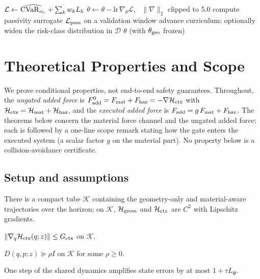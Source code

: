\begin{algorithm}[htbp]
\begin{algorithmic}[1]
    \State $\mathcal L\leftarrow\widehat{\mathrm{CVaR}_{\alpha_c}}+\sum_k w_kL_k$
    \State $\theta\leftarrow\theta-\mathrm{lr}\,\nabla_\theta\mathcal L$, \ $\|\nabla\|_2$ clipped to $5.0$
  \EndFor
  \State compute passivity surrogate $\mathcal L_{\rm pass}$ on a validation window
    \State advance curriculum; optionally widen the risk-class distribution in $\mathcal D$
  \EndIf
\EndFor
\State \Return $\theta$ (with $\theta_{\rm geo}$ frozen)
\end{algorithmic}
\end{algorithm}

\section{Theoretical Properties and Scope}
\label{app:theory}
We prove conditional properties, not end-to-end safety guarantees. Throughout, the \emph{ungated added force} is $F_{\rm add}^0=F_{\rm mat}+F_{\rm haz} =-\nabla\mathcal{H}_{\rm ctx}$ with $\mathcal{H}_{\rm ctx}=\mathcal{H}_{\rm mat}+\mathcal{H}_{\rm haz}$, and the \emph{executed added force} is $F_{\rm add}=g\,F_{\rm mat}+F_{\rm haz}$. The theorems below concern the material force channel and the ungated added
force; each is followed by a one-line scope remark stating how the gate enters
the executed system (a scalar factor $g$ on the material part). No property
below is a collision-avoidance certificate.

\subsection{Setup and assumptions}
\label{app:theory_setup}
\begin{assumption}\label{ass:regularity}
There is a compact tube $\mathcal K$ containing the geometry-only and
material-aware trajectories over the horizon; on $\mathcal K$, $\mathcal{H}_{\rm geom}$
and $\mathcal{H}_{\rm ctx}$ are $C^2$ with Lipschitz gradients.
\end{assumption}
\begin{assumption}\label{ass:bounded_ctx}
$\|\nabla_q\mathcal{H}_{\rm ctx}(q;z)\|\le G_{\rm ctx}$ on $\mathcal K$.
\end{assumption}
\begin{assumption}\label{ass:diss}
$D(q,p;z)\succeq\rho I$ on $\mathcal K$ for some $\rho\ge0$.
\end{assumption}
\begin{assumption}\label{ass:lipschitz_rollout}
One step of the shared dynamics amplifies state errors by at most $1+\tau L_\Phi$.
\end{assumption}

